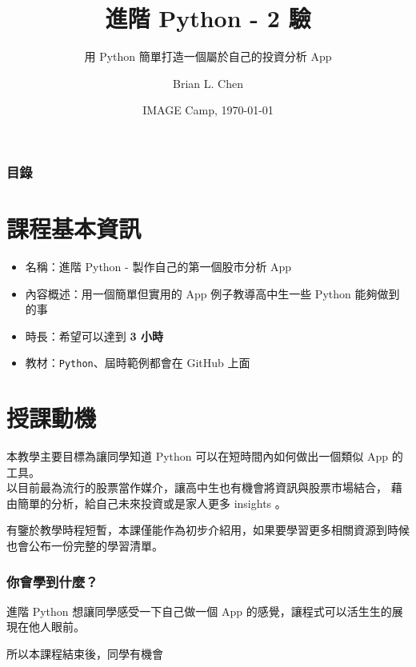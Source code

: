 \documentclass{beamer}
\title{進階 Python - 2 驗}
\subtitle{用 Python 簡單打造一個屬於自己的投資分析 App}
\author{Brian L. Chen}
\institute{
  Department of Information Management\\
  National Taiwan University
}
\date{IMAGE Camp, \today}
\newcommand{\code}[1]{\texttt{\textcolor{pinky}{#1}}}
\begin{document}
\frame{\titlepage}


\begin{frame}
\frametitle{目錄}
\tableofcontents
\end{frame}

\section{課程基本資訊}

\begin{frame}
  \begin{itemize}
    \item 名稱：進階 Python - 製作自己的第一個股市分析 App
    \item 內容概述：用一個簡單但實用的 App 例子教導高中生一些 Python 能夠做到的事
    \item 時長：希望可以達到 \alert{\textbf{3 小時}}
    \item 教材：\code{Python}、屆時範例都會在 GitHub 上面
  \end{itemize}

\end{frame}


\section{授課動機}

\begin{frame}
  本教學主要目標為讓同學知道 Python 可以在短時間內如何做出一個類似 App 的工具。\\
  以目前最為流行的股票當作媒介，讓高中生也有機會將資訊與股票市場結合，
  藉由簡單的分析，給自己未來投資或是家人更多 insights 。
  
  \vspace{5mm} %
  
  有鑒於教學時程短暫，本課僅能作為初步介紹用，如果要學習更多相關資源到時候也會公布一份完整的學習清單。
\end{frame}

\begin{frame}
  \frametitle{你會學到什麼？}
  進階 Python 想讓同學感受一下自己做一個 App 的感覺，讓程式可以活生生的展現在他人眼前。

  所以本課程結束後，同學有機會
  
\end{frame}
\end{document}
